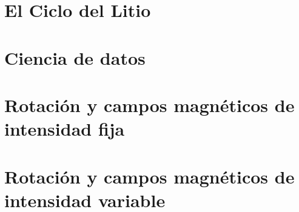 \documentclass[print, color]{ugrTFG}
\begin{document}
\maketitle


\frontmatter %

   
            

                    
               

\mainmatter %

\part{El Ciclo del Litio} %



\cleardoublepage
\part{Ciencia de datos}



\cleardoublepage
\part{Rotación y campos magnéticos de intensidad fija}




\cleardoublepage
\part{Rotación y campos magnéticos de intensidad variable}



\appendix %
\end{document}
